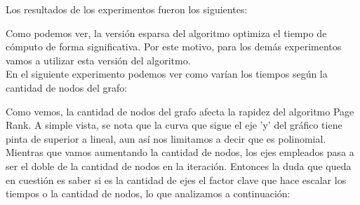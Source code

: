 Los resultados de los experimentos fueron los siguientes:

\begin{center}
\end{center}

Como podemos ver, la versión esparsa del algoritmo optimiza el tiempo de cómputo de forma significativa. Por este motivo, para los demás experimentos vamos a utilizar esta versión del algoritmo.\\

En el siguiente experimento podemos ver como varían los tiempos según la cantidad de nodos del grafo:

\begin{center}
\end{center}

Como vemos, la cantidad de nodos del grafo afecta la rapidez del algoritmo Page Rank. A simple vista, se nota que la curva que sigue el eje 'y' del gráfico tiene pinta de superior a lineal, aun así nos limitamos a decir que es polinomial. Mientras que vamos aumentando la cantidad de nodos, los ejes empleados pasa a ser el doble de la cantidad de nodos en la iteración. Entonces la duda que queda en cuestión es saber si es la cantidad de ejes el factor clave que hace escalar los tiempos o la cantidad de nodos, lo que analizamos a continuación:

